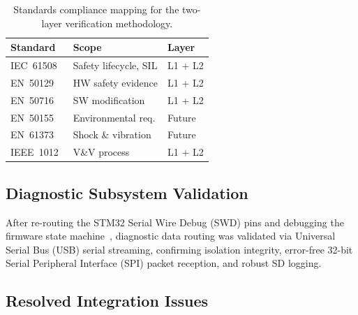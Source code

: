 \documentclass[journal, a4paper]{IEEEtran}
\newif\iffirstSPI   \firstSPItrue
\newcommand{\SPI}{\iffirstSPI Serial Peripheral Interface (SPI)\global\firstSPIfalse\else SPI\fi}
\newif\iffirstUSB   \firstUSBtrue
\newcommand{\USB}{\iffirstUSB Universal Serial Bus (USB)\global\firstUSBfalse\else USB\fi}
\begin{document}
\begin{table}[!t]
  \centering
  \caption{Standards compliance mapping for the two-layer verification methodology.}
  \label{tab:standards}
  \footnotesize
  \setlength{\tabcolsep}{4pt}
  \begin{tabular}{@{}lll@{}}
    \toprule
    \textbf{Standard} & \textbf{Scope} & \textbf{Layer} \\
    \midrule
    IEC~61508~\cite{iec61508_2010} & Safety lifecycle, SIL & L1 + L2 \\
    EN~50129~\cite{en50129_2018}   & HW safety evidence     & L1 + L2 \\
    EN~50716~\cite{en50716_2023}   & SW modification         & L1 + L2 \\
    EN~50155~\cite{en50155_2021}   & Environmental req.      & Future \\
    EN~61373~\cite{en61373_2010}   & Shock \& vibration       & Future \\
    IEEE~1012~\cite{ieee1012_2024} & V\&V process             & L1 + L2 \\
    \bottomrule
  \end{tabular}
\end{table}

\subsection{Diagnostic Subsystem Validation}

After re-routing the STM32 Serial Wire Debug (SWD) pins and debugging the firmware state machine~\cite{savchuk2025}, diagnostic data routing was validated via \USB{} serial streaming, confirming isolation integrity, error-free 32-bit \SPI{} packet reception, and robust SD logging.

\subsection{Resolved Integration Issues}
\label{sec:limitations}
\end{document}
